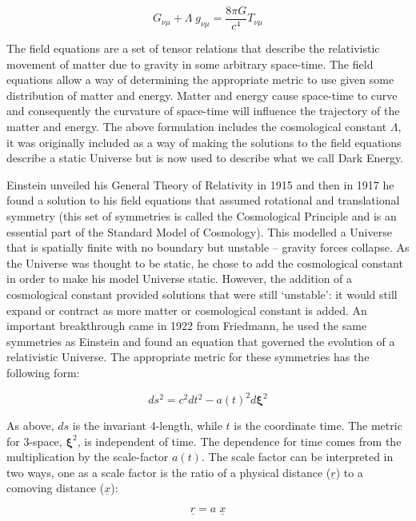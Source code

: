 \begin{equation}
\label{eqn_efe}
G_{\nu\mu} + \Lambda \; g_{\nu\mu} = \frac{8\pi G}{c^4}T_{\nu\mu}
\end{equation}

\noindent The field equations are a set of tensor relations that describe the relativistic movement of matter due to gravity in some arbitrary space-time. The field equations allow a way of determining the appropriate metric to use given some distribution of matter and energy. Matter and energy cause space-time to curve and consequently the curvature of space-time will influence the trajectory of the matter and energy. The above formulation includes the cosmological constant $\Lambda$, it was originally included as a way of making the solutions to the field equations describe a static Universe but is now used to describe what we call Dark Energy.

Einstein unveiled his General Theory of Relativity in 1915 and then in 1917 he found a solution to his field equations that assumed rotational and translational symmetry (this set of symmetries is called the Cosmological Principle and is an essential part of the Standard Model of Cosmology). This modelled a Universe that is spatially finite with no boundary but unstable -- gravity forces collapse. As the Universe was thought to be static, he chose to add the cosmological constant in order to make his model Universe static. However, the addition of a cosmological constant provided solutions that were still `unstable': it would still expand or contract as more matter or cosmological constant is added. An important breakthrough came in 1922 from Friedmann, he used the same symmetries as Einstein and found an equation that governed the evolution of a relativistic Universe. The appropriate metric for these symmetries has the following form:

\begin{equation}
\label{eqn_metric}
ds^2 = c ^2 dt^2 - a(t)^2 d\mathbf{\xi}^2
\end{equation}

\noindent As above, $ds$ is the invariant 4-length, while $t$ is the coordinate time. The metric for 3-space, $\mathbf{\xi}^2$, is independent of time. The dependence for time comes from the multiplication by the scale-factor $a(t)$. The scale factor can be interpreted in two ways, one as a scale factor is the ratio of a physical distance ($\underline {r}$) to a comoving distance ($\underline {x}$):

\begin{equation}
\label{eqn_scalefact}
\underline {r} = a \; \underline {x}
\end{equation}

